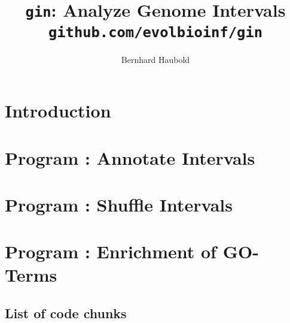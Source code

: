 \documentclass[a4paper]{report}
\begin{document}
\pagestyle{noweb}

\title{\texttt{gin}: Analyze Genome Intervals\\
\small\texttt{github.com/evolbioinf/gin}}
\author{Bernhard Haubold}
\maketitle
\tableofcontents

\chapter{Introduction}

\chapter{Program : Annotate Intervals}\label{ch:an}

\chapter{Program : Shuffle Intervals}\label{ch:sh}

\chapter{Program : Enrichment of GO-Terms}\label{ch:eg}

\section{List of code chunks}
\nowebchunks

\end{document}
